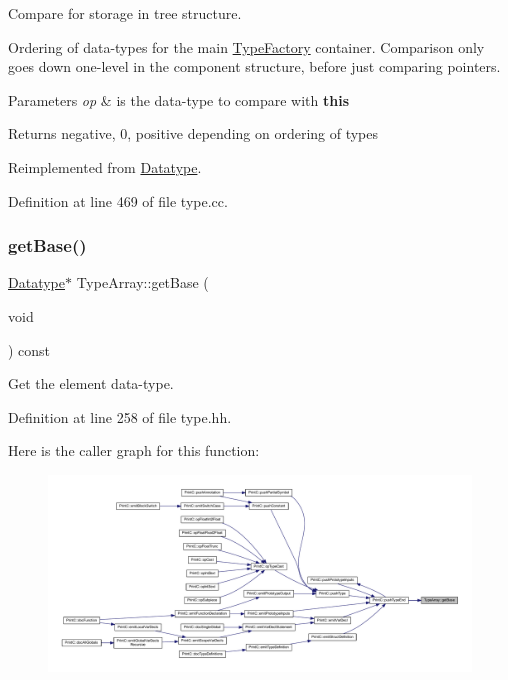 Compare for storage in tree structure. 

Ordering of data-\/types for the main \mbox{\hyperlink{class_type_factory}{Type\+Factory}} container. Comparison only goes down one-\/level in the component structure, before just comparing pointers. 
\begin{DoxyParams}{Parameters}
{\em op} & is the data-\/type to compare with {\bfseries{this}} \\
\hline
\end{DoxyParams}
\begin{DoxyReturn}{Returns}
negative, 0, positive depending on ordering of types 
\end{DoxyReturn}


Reimplemented from \mbox{\hyperlink{class_datatype_ab26e4ca2c3091d3c5a34b4fbd7be76ae}{Datatype}}.



Definition at line 469 of file type.\+cc.

\mbox{\label{class_type_array_ab6e6a5e04271b6af1f5c85fee3d94f7e}} 
\subsubsection{\texorpdfstring{getBase()}{getBase()}}
{\footnotesize\ttfamily \mbox{\hyperlink{class_datatype}{Datatype}}$\ast$ Type\+Array\+::get\+Base (\begin{DoxyParamCaption}\item[{void}]{ }\end{DoxyParamCaption}) const\hspace{0.3cm}{\ttfamily [inline]}}



Get the element data-\/type. 



Definition at line 258 of file type.\+hh.

Here is the caller graph for this function\+:
\nopagebreak
\begin{figure}[H]
\begin{center}
\leavevmode
\includegraphics[width=350pt]{class_type_array_ab6e6a5e04271b6af1f5c85fee3d94f7e_icgraph}
\end{center}
\end{figure}
\mbox{\label{class_type_array_ab5d2632de93ac8f4e0d36d804a2debda}} 
